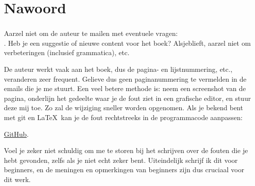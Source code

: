\part*{Nawoord}

\section{\NLph{}}

Aarzel niet om de auteur te mailen met eventuele vragen: \\
\GTT{<\EMAIL>}.
Heb je een suggestie of nieuwe content voor het boek?
Alsjeblieft, aarzel niet om verbeteringen (inclusief grammatica), etc.

De auteur werkt vaak aan het boek, dus de pagina- en lijstnummering, etc., veranderen zeer frequent.
Gelieve dus geen paginanummering te vermelden in de emails die je me stuurt.
Een veel betere methode is: neem een screenshot van de pagina, onderlijn het gedeelte waar je de fout ziet in een grafische editor,
en stuur deze mij toe. Zo zal de wijziging sneller worden opgenomen.
Als je bekend bent met git en \LaTeX\, kan je de fout rechtstreeks in de programmacode aanpassen:

\href{http://go.yurichev.com/17089}{GitHub}.

Voel je zeker niet schuldig om me te storen bij het schrijven over de fouten die je hebt gevonden, zelfs als je niet echt zeker bent.
Uiteindelijk schrijf ik dit voor beginners, en de meningen en opmerkingen van beginners zijn dus cruciaal voor dit werk.

